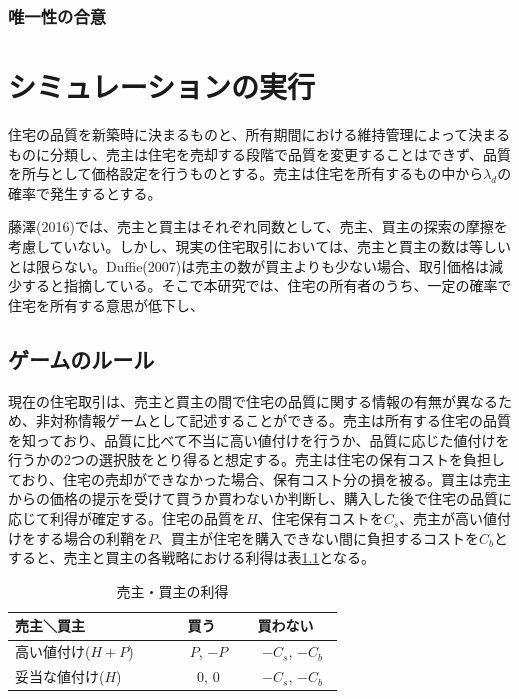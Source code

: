 \documentclass[a4paper,fontsize=11pt,report,notitlepage,line_length=38zw,number_of_lines=40,dvipdfmx]{jlreq}
\begin{document}
\subsection{唯一性の合意}


\chapter{シミュレーションの実行}
住宅の品質を新築時に決まるものと、所有期間における維持管理によって決まるものに分類し、売主は住宅を売却する段階で品質を変更することはできず、品質を所与として価格設定を行うものとする。売主は住宅を所有するもの中から$\lambda_{d}$の確率で発生するとする。

藤澤(2016)では、売主と買主はそれぞれ同数として、売主、買主の探索の摩擦を考慮していない。しかし、現実の住宅取引においては、売主と買主の数は等しいとは限らない。Duffie(2007)は売主の数が買主よりも少ない場合、取引価格は減少すると指摘している。そこで本研究では、住宅の所有者のうち、一定の確率で住宅を所有する意思が低下し、

\section{ゲームのルール}
現在の住宅取引は、売主と買主の間で住宅の品質に関する情報の有無が異なるため、非対称情報ゲームとして記述することができる。売主は所有する住宅の品質を知っており、品質に比べて不当に高い値付けを行うか、品質に応じた値付けを行うかの2つの選択肢をとり得ると想定する。売主は住宅の保有コストを負担しており、住宅の売却ができなかった場合、保有コスト分の損を被る。買主は売主からの価格の提示を受けて買うか買わないか判断し、購入した後で住宅の品質に応じて利得が確定する。住宅の品質を$H$、住宅保有コストを$C_s$、売主が高い値付けをする場合の利鞘を$P$、買主が住宅を購入できない間に負担するコストを$C_b$とすると、売主と買主の各戦略における利得は表\ref{ritoku}となる。

\begin{table}
\begin{center}
\caption{売主・買主の利得}
\label{ritoku}
\begin{tabular}{l|cc}
売主＼買主 & 買う & 買わない \\ \hline
高い値付け($H+P$)　　 & 　$P$,  $-P$ & 　$-C_s$,  $-C_b$　 \\
妥当な値付け($H$)　　 & 　0, 0 & 　$-C_s$,  $-C_b$　
\end{tabular}
\end{center}
\end{table}%
\end{document}
